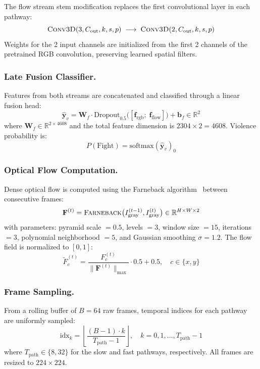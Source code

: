 \documentclass[11pt,a4paper]{article}
\newcommand{\R}{\mathbb{R}}
\newcommand{\softmax}{\mathrm{softmax}}
\begin{document}
The flow stream stem modification replaces the first convolutional layer in each pathway:
\begin{equation}
\textsc{Conv3D}(3, C_{\text{out}}, k, s, p) \;\longrightarrow\; \textsc{Conv3D}(2, C_{\text{out}}, k, s, p)
\end{equation}
Weights for the 2 input channels are initialized from the first 2 channels of the pretrained RGB convolution, preserving learned spatial filters.

\subsubsection{Late Fusion Classifier.}
Features from both streams are concatenated and classified through a linear fusion head:
\begin{equation}
\hat{\mathbf{y}}_v = \mathbf{W}_f \cdot \text{Dropout}_{0.5}\bigl([\mathbf{f}_{\text{rgb}};\; \mathbf{f}_{\text{flow}}]\bigr) + \mathbf{b}_f \in \R^2
\label{eq:fusion}
\end{equation}
where $\mathbf{W}_f \in \R^{2 \times 4608}$ and the total feature dimension is $2304 \times 2 = 4608$. Violence probability is:
\begin{equation}
P(\text{Fight}) = \softmax(\hat{\mathbf{y}}_v)_0
\end{equation}

\subsubsection{Optical Flow Computation.}
Dense optical flow is computed using the Farneback algorithm~\cite{farneback} between consecutive frames:
\begin{equation}
\mathbf{F}^{(t)} = \textsc{Farneback}\bigl(I_{\text{gray}}^{(t-1)}, I_{\text{gray}}^{(t)}\bigr) \in \R^{H \times W \times 2}
\end{equation}
with parameters: pyramid scale $= 0.5$, levels $= 3$, window size $= 15$, iterations $= 3$, polynomial neighborhood $= 5$, and Gaussian smoothing $\sigma = 1.2$. The flow field is normalized to $[0, 1]$:
\begin{equation}
\tilde{F}_c^{(t)} = \frac{F_c^{(t)}}{\|\mathbf{F}^{(t)}\|_{\max}} \cdot 0.5 + 0.5, \quad c \in \{x, y\}
\end{equation}

\subsubsection{Frame Sampling.}
From a rolling buffer of $B = 64$ raw frames, temporal indices for each pathway are uniformly sampled:
\begin{equation}
\text{idx}_k = \left\lfloor\frac{(B-1) \cdot k}{T_{\text{path}} - 1}\right\rfloor, \quad k = 0, 1, \ldots, T_{\text{path}} - 1
\end{equation}
where $T_{\text{path}} \in \{8, 32\}$ for the slow and fast pathways, respectively. All frames are resized to $224 \times 224$.
\end{document}
